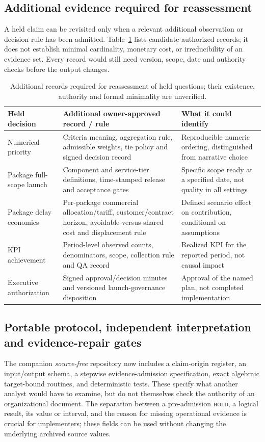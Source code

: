 \documentclass[systems,article,submit,moreauthors]{Definitions/mdpi}
\begin{document}
\subsection{Additional evidence required for reassessment}
A held claim can be revisited only when a relevant additional observation or decision rule has been admitted. Table~\ref{tab:minimum} lists candidate authorized records; it does not establish minimal cardinality, monetary cost, or irreducibility of an evidence set. Every record would still need version, scope, date and authority checks before the output changes.
\begin{table}[H]
\centering\footnotesize
\caption{Additional records required for reassessment of held questions; their existence, authority and formal minimality are unverified.}
\label{tab:minimum}
\begin{tabularx}{\linewidth}{>{\raggedright\arraybackslash}p{2.4cm} X X}
\toprule
Held decision & Additional owner-approved record / rule & What it could identify \\
\midrule
Numerical priority & Criteria meaning, aggregation rule, admissible weights, tie policy and signed decision record & Reproducible numeric ordering, distinguished from narrative choice \\
Package full-scope launch & Component and service-tier definitions, time-stamped release and acceptance gates & Specific scope ready at a specified date, not quality in all settings \\
Package delay economics & Per-package commercial allocation/tariff, customer/contract horizon, avoidable-versus-shared cost and displacement rule & Defined scenario effect on contribution, conditional on assumptions \\
KPI achievement & Period-level observed counts, denominators, scope, collection rule and QA record & Realized KPI for the reported period, not causal impact \\
Executive authorization & Signed approval/decision minutes and versioned launch-governance disposition & Approval of the named plan, not completed implementation \\
\bottomrule
\end{tabularx}
\end{table}


\subsection{Portable protocol, independent interpretation and evidence-repair gates}
The companion \emph{source-free} repository now includes a claim-origin register, an input/output schema, a stepwise evidence-admission specification, exact algebraic target-bound routines, and deterministic tests. These specify what another analyst would have to examine, but do not themselves check the authority of an organizational document. The separation between a pre-admission \textsc{hold}, a logical result, its value or interval, and the reason for missing operational evidence is crucial for implementers; these fields can be used without changing the underlying archived source values.
\end{document}
